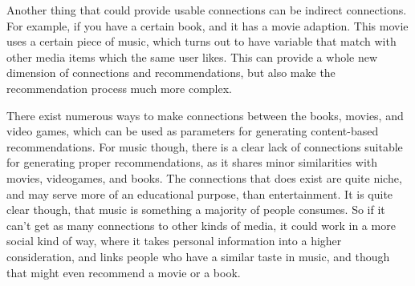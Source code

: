 Another thing that could provide usable connections can be indirect connections. For example, if you have a certain book, and it has a movie adaption. This movie uses a certain piece of music, which turns out to have variable that match with other media items which the same user likes. This can provide a whole new dimension of connections and recommendations, but also make the recommendation process much more complex.

There exist numerous ways to make connections between the books, movies, and video games, which can be used as parameters for generating content-based recommendations. For music though, there is a clear lack of connections suitable for generating proper recommendations, as it shares minor similarities with movies, videogames, and books. The connections that does exist are quite niche, and may serve more of an educational purpose, than entertainment. It is quite clear though, that music is something a majority of people consumes. So if it can’t get as many connections to other kinds of media, it could work in a more social kind of way, where it takes personal information into a higher consideration, and links people who have a similar taste in music, and though that might even recommend a movie or a book.